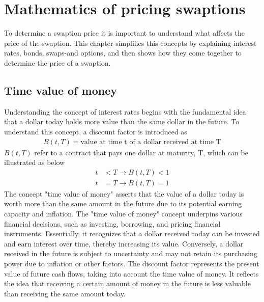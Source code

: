 \section{Mathematics of pricing swaptions}
To determine a swaption price it is important to understand what affects the price of the swaption. 
This chapter simplifies this concepts by explaining interest rates, bonds, swaps-and options, 
and then shows how they come together to determine the price of a swaption.
\subsection{Time value of money}
Understanding the concept of interest rates begins with the fundamental idea that a dollar today holds 
more value than the same dollar in the future. To understand this concept, a discount factor is introduced as 
\begin{align*}
    B(t,T) = \text{value at time t of a dollar received at time T}
\end{align*} 
$B(t,T)$ refer to a contract that pays one dollar at maturity, T, which can be illustrated as below
\begin{align*}
    t & < T \rightarrow B(t,T) < 1 \\
    t & = T \rightarrow B(t,T) = 1
\end{align*}
The concept "time value of money" asserts that the value of a dollar today is worth more than
the same amount in the future due to its potential earning capacity and inflation.
The "time value of money" concept underpins various financial decisions, such as investing, borrowing,
and pricing financial instruments. Essentially, it recognizes that a dollar received today can be invested 
and earn interest over time, thereby increasing its value. Conversely, a dollar received in the future
is subject to uncertainty and may not retain its purchasing power due to inflation or other factors.
The discount factor represents the present value of future cash flows, taking into account the time value of money.
It reflects the idea that receiving a certain amount of money in the future is less valuable than receiving 
the same amount today.
